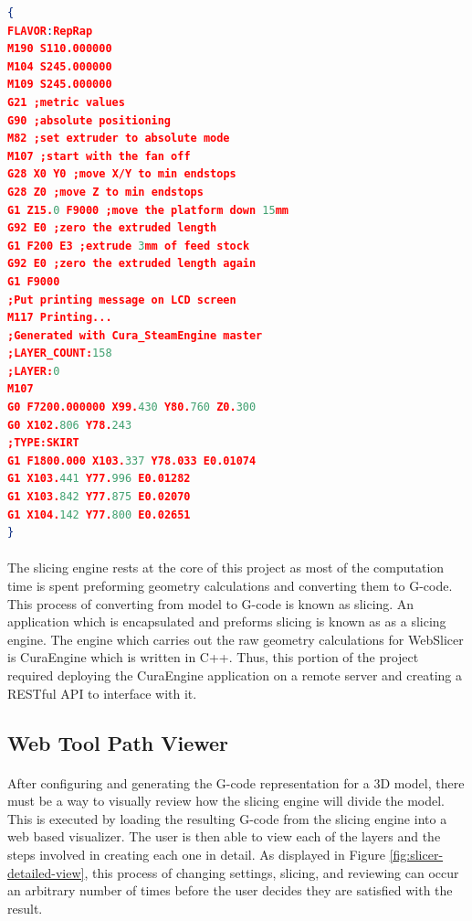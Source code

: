 \begin{lstlisting}[language=json, style=thesiscode , label={lst:gcode}, caption=A sample of G-code that results from slicing using CuraEngine.]
{
FLAVOR:RepRap
M190 S110.000000
M104 S245.000000
M109 S245.000000
G21 ;metric values
G90 ;absolute positioning
M82 ;set extruder to absolute mode
M107 ;start with the fan off
G28 X0 Y0 ;move X/Y to min endstops
G28 Z0 ;move Z to min endstops
G1 Z15.0 F9000 ;move the platform down 15mm
G92 E0 ;zero the extruded length
G1 F200 E3 ;extrude 3mm of feed stock
G92 E0 ;zero the extruded length again
G1 F9000
;Put printing message on LCD screen
M117 Printing...
;Generated with Cura_SteamEngine master
;LAYER_COUNT:158
;LAYER:0
M107
G0 F7200.000000 X99.430 Y80.760 Z0.300
G0 X102.806 Y78.243
;TYPE:SKIRT
G1 F1800.000 X103.337 Y78.033 E0.01074
G1 X103.441 Y77.996 E0.01282
G1 X103.842 Y77.875 E0.02070
G1 X104.142 Y77.800 E0.02651
}
\end{lstlisting}

\paragraph{}
The slicing engine rests at the core of this project as most of the computation time is spent preforming geometry calculations and converting them to G-code.
This process of converting from model to G-code is known as slicing.
An application which is encapsulated and preforms slicing is known as as a slicing engine.
The engine which carries out the raw geometry calculations for WebSlicer is CuraEngine which is written in C++.
Thus, this portion of the project required deploying the CuraEngine application on a remote server and creating a RESTful API to interface with it.

\subsection{Web Tool Path Viewer}
\paragraph{}
After configuring and generating the G-code representation for a 3D model, there must be a way to visually review how the slicing engine will divide the model.
This is executed by loading the resulting G-code from the slicing engine into a web based visualizer.
The user is then able to view each of the layers and the steps involved in creating each one in detail.
As displayed in Figure \ref{fig:slicer-detailed-view}, this process of changing settings, slicing, and reviewing can occur an arbitrary number of times before the user decides they are satisfied with the result.

